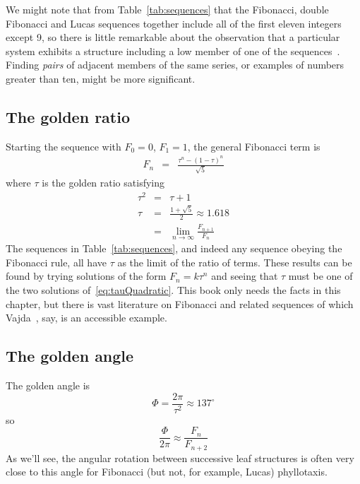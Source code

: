 We might note that from Table~\ref{tab:sequences} that the Fibonacci, double Fibonacci and Lucas sequences together include all  of the first eleven integers except 9, so there is little remarkable about the observation that a particular system exhibits a structure including a low member of one of the sequences~\cite{cookeFibonacciNumbersReveal2006}. Finding \textit{pairs} of adjacent members of the same series, or examples of numbers greater than ten, might be more significant.

\subsection{The golden ratio}
Starting the sequence with $F_0=0$, $F_1=1$, the general Fibonacci term is 
\begin{eqnarray}
F_n &=& \frac{\tau^n - (1-\tau)^n}{\sqrt{5}}
\end{eqnarray}
where $\tau$ is the golden ratio 
satisfying
\begin{eqnarray}
\tau^2 &=& \tau+1 \label{eq:tauQuadratic}
\\
\tau &=& \frac{1+\sqrt{5}}{2} \approx 1.618
\\
&=& \lim_{n\rightarrow\infty} \frac{F_{n+1}}{F_n} 
\end{eqnarray}
The sequences in Table~\ref{tab:sequences}, and indeed any sequence obeying the Fibonacci rule, all have $\tau$  as the limit of the ratio of terms. These results can be found by trying solutions of the form $F_n=k\tau^n$ and seeing that $\tau$ must be one of the two solutions of~\eqref{eq:tauQuadratic}. This book only needs the facts in this chapter, but there is vast literature on Fibonacci and related sequences of which Vajda~\cite{vajdaFibonacciLucasNumbers2008}, say, is an  accessible example. 

\subsection{The golden angle}
The golden angle is
\[
\Phi = \frac{2\pi}{\tau^2}  \approx 137^\circ
\]
so
\[
\frac{\Phi}{2 \pi} \approx \frac{F_{n}}{F_{n+2}}
\]
As we'll see, the angular rotation between successive leaf structures is often very close to this angle for Fibonacci (but not, for example, Lucas) phyllotaxis.




